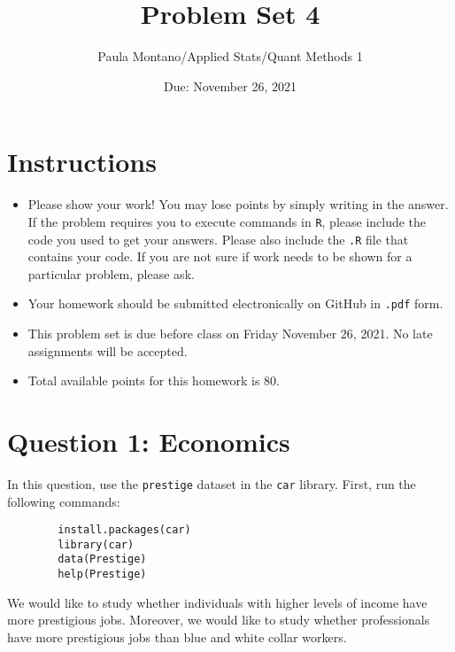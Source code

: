 \documentclass[12pt,letterpaper]{article}
\title{Problem Set 4}
\date{Due: November 26, 2021}
\author{Paula Montano/Applied Stats/Quant Methods 1}
\begin{document}
	\maketitle
	\section*{Instructions}
	\begin{itemize}
		\item Please show your work! You may lose points by simply writing in the answer. If the problem requires you to execute commands in \texttt{R}, please include the code you used to get your answers. Please also include the \texttt{.R} file that contains your code. If you are not sure if work needs to be shown for a particular problem, please ask.
		\item Your homework should be submitted electronically on GitHub in \texttt{.pdf} form.
		\item This problem set is due before class on Friday November 26, 2021. No late assignments will be accepted.
		\item Total available points for this homework is 80.
	\end{itemize}
	
	
	
	\vspace{.5cm}
	\section*{Question 1: Economics}
	\vspace{.25cm}
	\noindent 	
	In this question, use the \texttt{prestige} dataset in the \texttt{car} library. First, run the following commands:
	
	\begin{verbatim}
		install.packages(car)
		library(car)
		data(Prestige)
		help(Prestige)
	\end{verbatim} 
	
	
	\noindent We would like to study whether individuals with higher levels of income have more prestigious jobs. Moreover, we would like to study whether professionals have more prestigious jobs than blue and white collar workers.
	
\end{document}
